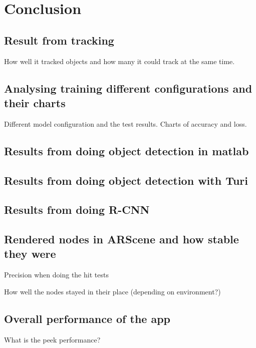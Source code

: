 \section{Conclusion}

\subsection{Result from tracking}

How well it tracked objects and how many it could track at the same time.

\subsection{Analysing training different configurations and their charts}

Different model configuration and the test results. Charts of accuracy and loss.

\subsection{Results from doing object detection in matlab}

\subsection{Results from doing object detection with Turi}

\subsection{Results from doing R-CNN}

\subsection{Rendered nodes in ARScene and how stable they were}
Precision when doing the hit tests

How well the nodes stayed in their place (depending on environment?)

\subsection{Overall performance of the app}

What is the peek performance?



\newpage